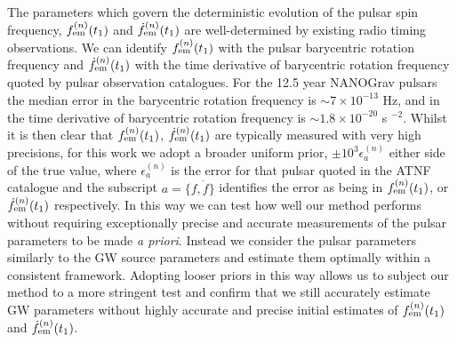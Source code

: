 \documentclass[fleqn,usenatbib,useAMS]{mnras}
\begin{document}
The parameters which govern the deterministic evolution of the pulsar spin frequency, $f_{\rm em}^{(n)} (t_1)$ and $\dot{f}_{\rm em}^{(n)} (t_1)$ are well-determined by existing radio timing observations. We can identify $f_{\rm em}^{(n)} (t_1)$ with the pulsar barycentric rotation frequency and $\dot{f}_{\rm em}^{(n)} (t_1)$ with the time derivative of barycentric rotation frequency quoted by pulsar observation catalogues. For the 12.5 year NANOGrav pulsars the median error in  the barycentric rotation frequency is $\sim 7 \times 10^{-13}$ Hz, and in the time derivative of barycentric rotation frequency is $\sim 1.8 \times 10^{-20}$ s $^{-2}$. Whilst it is then clear that $f_{\rm em}^{(n)} (t_1)$, $\dot{f}_{\rm em}^{(n)} (t_1)$ are typically measured with very high precisions, for this work we adopt a broader uniform prior, $\pm 10^3 \epsilon^{(n)}_{a}$ either side of the true value, where $\epsilon^{(n)}_{a}$ is the error for that pulsar quoted in the ATNF catalogue and the subscript $a = \{ f, \dot{f} \}$ identifies the error as being in $f_{\rm em}^{(n)} (t_1)$, or $\dot{f}_{\rm em}^{(n)} (t_1)$ respectively. In this way we can test how well our method performs without requiring exceptionally precise and accurate measurements of the pulsar parameters to be made \textit{a priori}. Instead we consider the pulsar parameters similarly to the GW source parameters and estimate them optimally within a consistent framework. Adopting looser priors in this way allows us to subject our method to a more stringent test and confirm that we still accurately estimate GW parameters without highly accurate and precise initial estimates of $f_{\rm em}^{(n)} (t_1)$ and $\dot{f}_{\rm em}^{(n)} (t_1)$. \newline 
\end{document}
